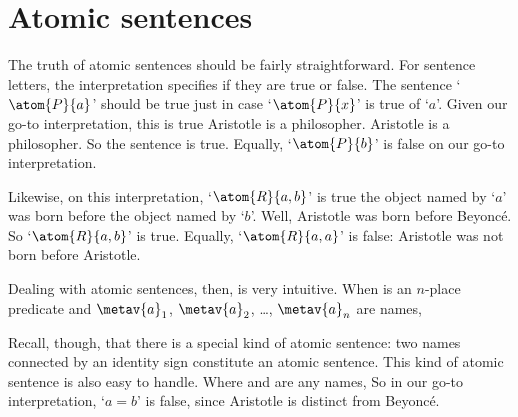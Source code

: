 \section{Atomic sentences}
The truth of atomic sentences should be fairly straightforward. For sentence letters, the interpretation specifies if they are true or false. The sentence `$\atom{P}{a}$' should be true just in case `$\atom{P}{x}$' is true of `$a$'. Given our go-to interpretation, this is true \ifeff{} Aristotle is a philosopher. Aristotle is a philosopher. So the sentence is true. Equally, `$\atom{P}{b}$' is false on our go-to interpretation.

Likewise, on this interpretation, `$\atom{R}{a,b}$' is true \ifeff{} the object named by `$a$' was born before the object named by `$b$'. Well, Aristotle was born before Beyonc\'e. So `$\atom{R}{a,b}$' is true. Equally, `$\atom{R}{a,a}$' is false: Aristotle was not born before Aristotle.

Dealing with atomic sentences, then, is very intuitive. When  is an $n$-place predicate and $\metav{a}_1$, $\metav{a}_{2}$, \dots, $\metav{a}_{n}$ are names, 

Recall, though, that there is a special kind of atomic sentence: two names connected by an identity sign constitute an atomic sentence. This kind of atomic sentence is also easy to handle. Where  and  are any names, 
So in our go-to interpretation, `$a = b$' is false, since Aristotle is distinct from Beyonc\'e.


